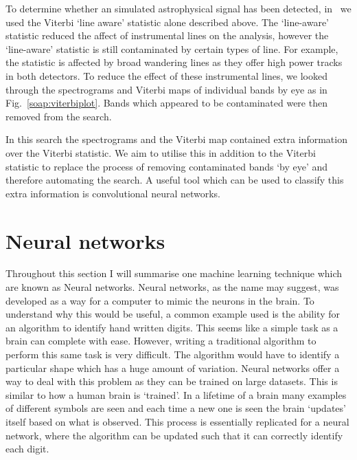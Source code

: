 %
To determine whether an simulated astrophysical signal has been detected,
in~\cite{bayley2019SOAPGeneralised} we used the Viterbi `line aware' statistic alone described above.  
The `line-aware' statistic reduced the affect of instrumental lines on the analysis, however the `line-aware' statistic is still contaminated by certain types of line.
For example, the statistic is affected by broad wandering lines as they offer high power tracks in both detectors.
To reduce the effect of these instrumental lines, we looked through the spectrograms and
Viterbi maps of individual bands by eye as in Fig.~\ref{soap:viterbiplot}.
Bands which appeared to be contaminated were then removed from the search.

%
In this search the spectrograms and the Viterbi map contained extra information
over the Viterbi statistic. 
We aim to utilise this in addition to the Viterbi statistic to replace the process of removing contaminated bands `by eye' and therefore automating the search. 
A useful tool which can be used to classify this extra information is convolutional neural networks. 

\section{\label{machine:nn}Neural networks}


Throughout this section I will summarise one machine learning technique which are known as Neural networks. 
Neural networks, as the name may suggest, was developed as a way for a computer to mimic the neurons in the brain.
To understand why this would be useful, a common example used is the ability for an algorithm to identify hand written digits.
This seems like a simple task as a brain can complete with ease. 
However, writing a traditional algorithm to perform this same task is very difficult. 
The algorithm would have to identify a particular shape which has a huge amount of variation.
Neural networks offer a way to deal with this problem as they can be trained on large datasets.
This is similar to how a human brain is `trained'. 
In a lifetime of a brain many examples of different symbols are seen and each time a new one is seen the brain `updates' itself based on what is observed. 
This process is essentially replicated for a neural network, where the algorithm can be updated such that it can correctly identify each digit.

